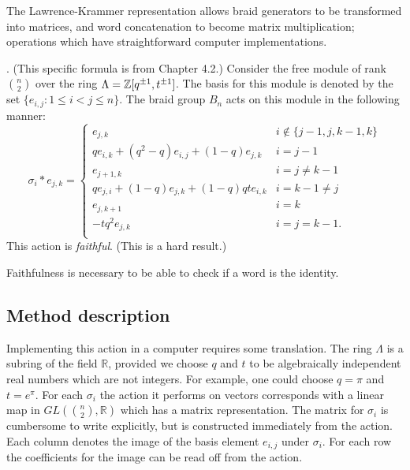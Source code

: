 \documentclass[12pt]{thesis}
\begin{document}
The Lawrence-Krammer representation allows braid
generators to be transformed into matrices,
and word concatenation to become matrix multiplication;
operations which have straightforward computer implementations.

\begin{proposition}
    \cite{lk-representation}. (This specific formula is from Chapter 4.2.)
Consider the  free module of rank ${n \choose 2}$
over the ring $\Lambda = \mathbb{Z}[q^{\pm 1}, t^{\pm 1}]$.
The basis for this module is denoted by the set $\{ e_{i, j} \colon 1 \leq i < j \leq n \}$.
The braid group $B_{n}$ acts on this module in the following manner:
\[
    \sigma_{i} * e_{j, k} =
    \begin{cases}
        e_{j, k} & i \not\in \{ j -1, j, k -1, k \} \\
        qe_{i, k} + (q^{2} - q)e_{i, j} + (1-q)e_{j, k} & i = j -1 \\
        e_{j + 1, k} & i = j \neq k -1 \\
        qe_{j, i} + (1 - q) e_{j, k} + (1 - q)qte_{i, k} & i = k - 1 \neq j \\
        e_{j, k +1} & i = k \\
        -tq^{2} e_{j, k} & i = j = k - 1. \\
    \end{cases}
\]
This action is \textit{faithful}. (This is a hard result.)
\end{proposition}

Faithfulness is necessary to be able
to check if a word is the identity.

\subsection{Method description}

Implementing this action in a computer requires some translation.
The ring $\Lambda$ is a subring of the field $\mathbb{R}$,
provided we choose $q$ and $t$ to be algebraically independent
real numbers which are not integers.
For example, one could choose $q = \pi$ and $t = e^{\pi}$.
For each $\sigma_{i}$ the action it performs on vectors corresponds with a linear map
in $GL({ n \choose 2}, \mathbb{R})$ which has a matrix representation.
The matrix for $\sigma_{i}$ is cumbersome to write explicitly, but is
constructed immediately from the action.
Each column denotes the image of the basis element $e_{i, j}$ under $\sigma_{i}$.
For each row the coefficients for the image
can be read off from the action.
\end{document}
